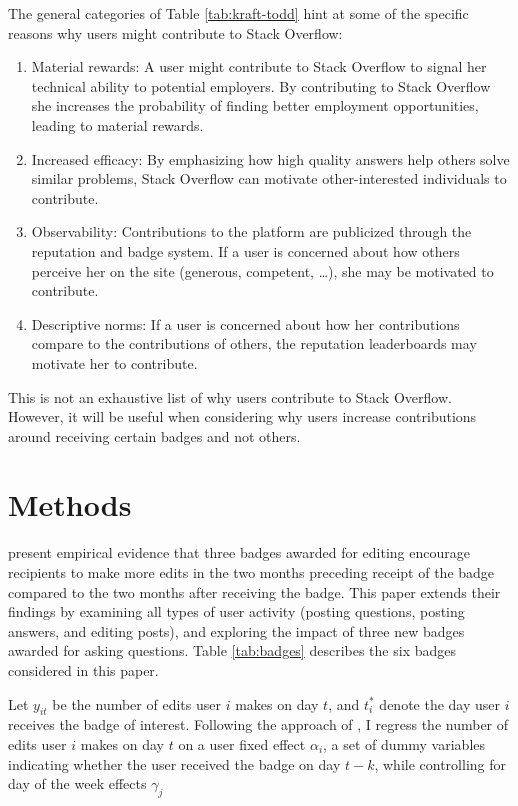 \documentclass[conference]{IEEEtran}
\newcommand{\1}{\mathds{1}}
\begin{document}
The general categories of Table \ref{tab:kraft-todd} hint at some of the specific reasons why users might contribute to Stack Overflow:
\begin{enumerate}
\item Material rewards: A user might contribute to Stack Overflow to
  signal her technical ability to potential employers. By
  contributing to Stack Overflow she increases the probability of
  finding better employment opportunities, leading to material
  rewards.
\item Increased efficacy: By emphasizing how high quality
  answers help others solve similar problems, Stack
  Overflow can motivate other-interested individuals to contribute.
\item Observability: Contributions to the platform are publicized
  through the reputation and badge system. If a user is concerned
  about how others perceive her on the site (generous, competent, \dots),
  she may be motivated to contribute.
\item Descriptive norms: If a user is concerned about how her
  contributions compare to the contributions of others, the reputation
  leaderboards may motivate her to contribute.
\end{enumerate}
This is not an exhaustive list of why users contribute to Stack Overflow. However, it will be useful when considering why users increase contributions around receiving certain badges and not others.



\section{Methods}

\citet{Grant2013} present empirical evidence that three badges awarded for editing encourage recipients to make more edits in the two months preceding receipt of the badge compared to the two months after receiving the badge. This paper extends their findings by examining all types of user activity (posting questions, posting answers, and editing posts), and exploring the impact of three new badges awarded for asking questions. Table \ref{tab:badges} describes the six badges considered in this paper.

Let $y_{it}$ be the number of edits user $i$ makes on day $t$, and $t_i^*$ denote the day user $i$ receives the badge of interest. Following the approach of \citet{Jacobson1993}, I regress the number of edits user $i$ makes on day $t$ on a user fixed effect $\alpha_i$, a set of dummy variables indicating whether the user received the badge on day $t-k$, while controlling for day of the week effects $\gamma_j$
\end{document}
